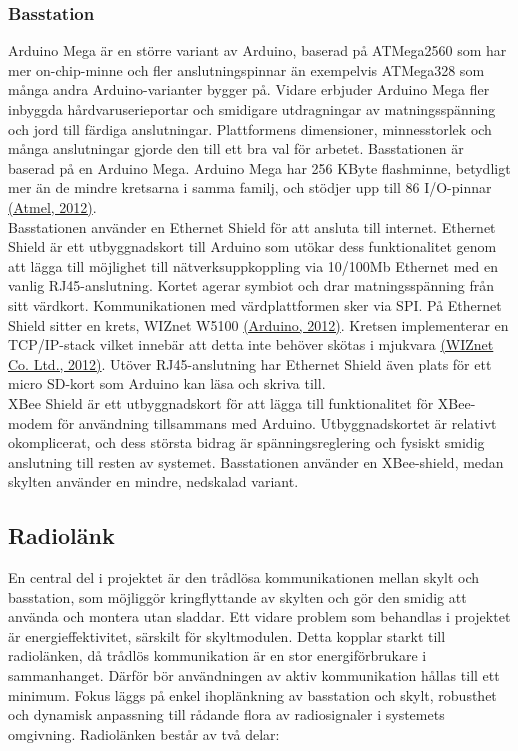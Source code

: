 \documentclass[a4paper,11pt]{article}
\begin{document}
\subsubsection{Basstation}
Arduino Mega är en större variant av Arduino, baserad på ATMega2560 som har mer on-chip-minne och fler anslutningspinnar än exempelvis ATMega328 som många andra Arduino-varianter bygger på. Vidare erbjuder Arduino Mega fler inbyggda hårdvaruserieportar och smidigare utdragningar av matningsspänning och jord till färdiga anslutningar. Plattformens dimensioner, minnesstorlek och många anslutningar gjorde den till ett bra val för arbetet. Basstationen är baserad på en Arduino Mega. Arduino Mega har 256 KByte flashminne, betydligt mer än de mindre kretsarna i samma familj, och stödjer upp till 86 I/O-pinnar \hyperref[atmel]{(Atmel, 2012)}. \\

Basstationen använder en Ethernet Shield för att ansluta till internet. Ethernet Shield är ett utbyggnadskort till Arduino som utökar dess funktionalitet genom att lägga till möjlighet till nätverksuppkoppling via 10/100Mb Ethernet med en vanlig RJ45-anslutning. Kortet agerar symbiot och drar matningsspänning från sitt värdkort. Kommunikationen med värdplattformen sker via SPI. På Ethernet Shield sitter en krets, WIZnet W5100 \hyperref[arduino]{(Arduino, 2012)}. Kretsen implementerar en TCP/IP-stack vilket innebär att detta inte behöver skötas i mjukvara \hyperref[wiznet]{(WIZnet Co. Ltd., 2012)}. Utöver RJ45-anslutning har Ethernet Shield även plats för ett micro SD-kort som Arduino kan läsa och skriva till. \\

XBee Shield är ett utbyggnadskort för att lägga till funktionalitet för XBee-modem för användning tillsammans med Arduino. Utbyggnadskortet är relativt okomplicerat, och dess största bidrag är spänningsreglering och fysiskt smidig anslutning till resten av systemet. Basstationen använder en XBee-shield, medan skylten använder en mindre, nedskalad variant.

\subsection{Radiolänk}
En central del i projektet är den trådlösa kommunikationen mellan skylt och basstation, som möjliggör kringflyttande av skylten och gör den smidig att använda och montera utan sladdar. Ett vidare problem som behandlas i projektet är energieffektivitet, särskilt för skyltmodulen. Detta kopplar starkt till radiolänken, då trådlös kommunikation är en stor energiförbrukare i sammanhanget. Därför bör användningen av aktiv kommunikation hållas till ett minimum. Fokus läggs på enkel ihoplänkning av basstation och skylt, robusthet och dynamisk anpassning till rådande flora av radiosignaler i systemets omgivning. Radiolänken består av två delar:
	
\end{document}
